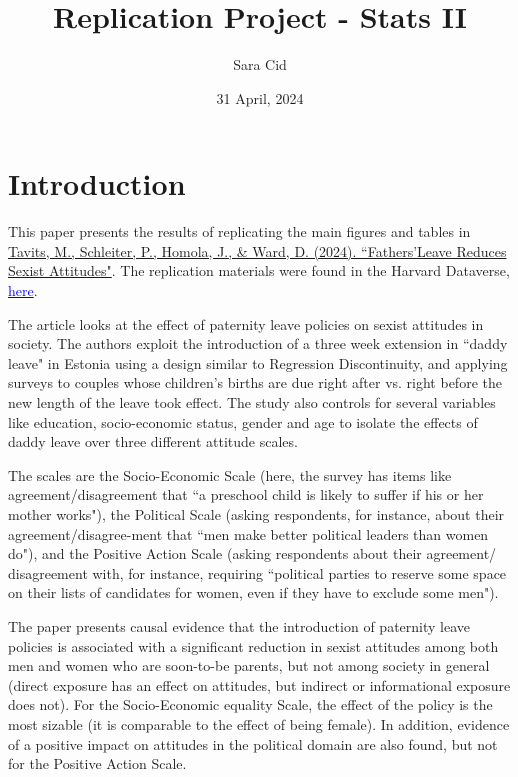 \documentclass[12pt,letterpaper]{article}
\title{Replication Project - Stats II}
\date{31 April, 2024}
\author{Sara Cid}
\begin{document}
	
\maketitle

\section*{Introduction} 
\vspace{.25cm}

\noindent This paper presents the results of replicating the main figures and tables in  
\href{doi:10.1017/S0003055423000369}{Tavits, M., Schleiter, P., Homola, J., \& Ward, D. (2024). ``Fathers’Leave Reduces Sexist Attitudes"}. 
The replication materials were found in the Harvard Dataverse,
\href{https://dataverse.harvard.edu/dataset.xhtml?persistentId=doi:10.7910/DVN/4DUB7X}{\textcolor{blue}{here}}.

The article looks at the effect of paternity leave policies on sexist attitudes in society. The authors exploit the introduction of a three week extension in “daddy leave" in Estonia using a design similar to Regression Discontinuity, and applying surveys to couples whose children's births are due right after vs. right before the new length of the leave took effect. The study also controls for several variables like education, socio-economic status, gender and age to isolate the effects of daddy leave over three different attitude scales. 

The scales are the Socio-Economic Scale (here, the survey has items like agreement/disagreement that “a preschool child is likely to suffer if his or her mother works"), the Political Scale (asking respondents, for instance, about their agreement/disagree-ment that “men make better political leaders than women do"), and the Positive Action Scale (asking respondents about their agreement/ disagreement with, for instance, requiring “political parties to reserve some space on their lists of candidates for women, even if they have to exclude some men"). 

The paper presents causal evidence that the introduction of paternity leave policies is associated with a significant reduction in sexist attitudes among both men and women who are soon-to-be parents, but not among society in general (direct exposure has an effect on attitudes, but indirect or informational exposure does not). For the Socio-Economic equality Scale, the effect of the policy is the most sizable (it is comparable to the effect of being female). In addition, evidence of a positive impact on attitudes in the political domain are also found, but not for the Positive Action Scale. 
\end{document}
